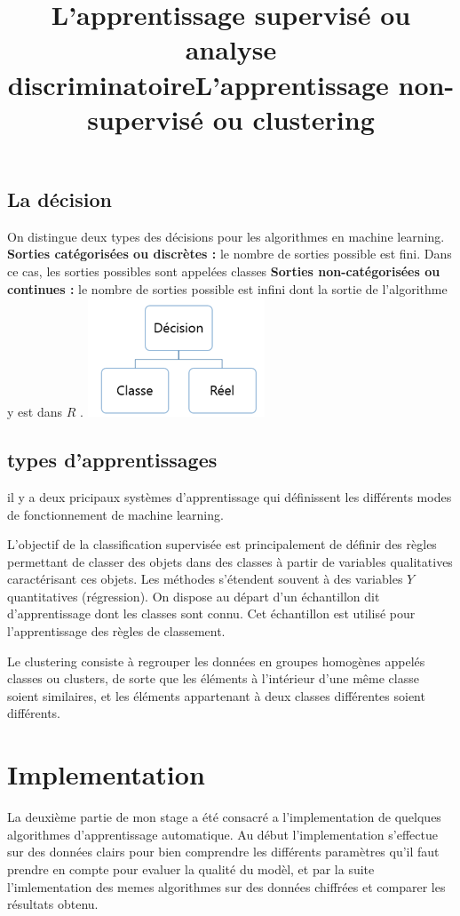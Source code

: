 \documentclass[a4paper,11pt]{report}
\begin{document}
\subsection{La décision} 
On distingue deux types des décisions pour les algorithmes en machine learning. \newline
\textbf{Sorties catégorisées ou discrètes :} le nombre de sorties possible est fini. Dans ce cas, les sorties possibles sont appelées classes\newline
\textbf{Sorties non-catégorisées ou continues :} le nombre de sorties possible est infini dont la sortie de l'algorithme y est dans $R$ .\newline
\hspace*{5cm}{}\includegraphics[scale=1]{classifictation_vs_regression.png}
\subsection{types d'apprentissages}
il y a deux pricipaux systèmes d'apprentissage qui définissent les différents modes de fonctionnement de machine learning.\newline
\title{\textbf{L’apprentissage supervisé ou analyse discriminatoire}}\newline
L'objectif de la classification supervisée est principalement de définir des règles permettant de classer des objets dans des classes
à partir de variables qualitatives caractérisant ces objets. Les méthodes s'étendent souvent à des variables $Y$ quantitatives (régression).
On dispose au départ d'un échantillon dit d'apprentissage dont les classes sont connu. Cet échantillon est utilisé pour l'apprentissage des règles de classement.\newline 
\title{\textbf{L’apprentissage non-supervisé ou clustering}}\newline
Le clustering consiste à regrouper les données en groupes homogènes appelés classes ou clusters, de sorte que les éléments à l’intérieur d’une même classe soient similaires, et les éléments appartenant à deux classes différentes soient différents.
\section{Implementation}
La deuxième partie de mon stage a été consacré a l'implementation de quelques algorithmes d'apprentissage automatique.\newline
Au début l'implementation s'effectue sur des données clairs pour bien comprendre les différents paramètres qu'il faut prendre en compte pour evaluer la qualité du modèl, et par la suite l'imlementation des memes algorithmes sur des données chiffrées et comparer les résultats obtenu. \newline      
\end{document}
